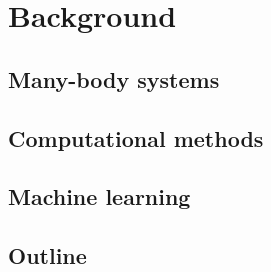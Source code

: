\chapter{Background}

\section{Many-body systems}

\section{Computational methods}

\section{Machine learning}

\section{Outline}

